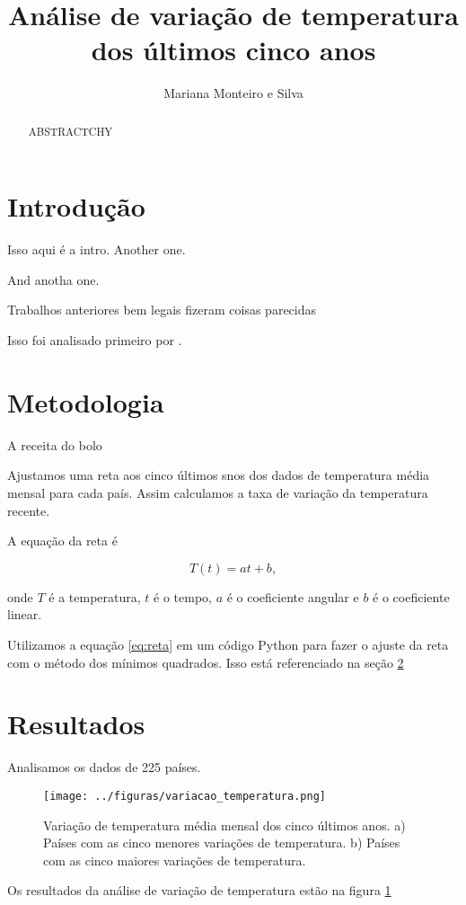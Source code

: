 \documentclass{article} %
\begin{document}
\title{Análise de variação de temperatura dos últimos cinco anos}
\author{Mariana Monteiro e Silva}
\maketitle



\begin{abstract}
ABSTRACTCHY

\end{abstract}

\section{Introdução}
\label{sec:intro}
Isso aqui é a intro.
Another one.

And anotha one.

Trabalhos anteriores bem legais fizeram coisas parecidas 
\citep{Hansen2010}

Isso foi analisado primeiro por \citet{Hansen2010}.

\section{Metodologia}
\label{sec:metodos}

A receita do bolo

Ajustamos uma reta aos cinco últimos snos dos dados
de temperatura média mensal para cada país.
Assim calculamos a taxa de variação da temperatura recente.

A equação da reta é

\begin{equation}
T(t) = at + b,
\label{eq:reta}
\end{equation}

\noindent
onde $T$ é a temperatura, $t$ é o tempo, $a$ é o coeficiente angular 
e $b$ é o coeficiente linear.

Utilizamos a equação \ref{eq:reta} em um código Python para fazer 
o ajuste da reta com o método dos mínimos quadrados. Isso está referenciado na seção \ref{sec:metodos}

\section{Resultados}
\label{sec:resultados}

Analisamos os dados de 225 países.

\begin{figure}
	\centering
	\texttt{[image: ../figuras/variacao\_temperatura.png]}
	\caption{
		Variação de temperatura média mensal dos cinco últimos anos.
		a) Países com as cinco menores variações de temperatura.
		b) Países com as cinco maiores variações de temperatura.
	}
\label{fig:variacao}
\end{figure}


Os resultados da análise de variação de temperatura estão na figura \ref{fig:variacao}





\end{document}
